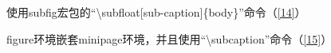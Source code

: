 \documentclass{article}
\begin{document}
    使用subfig宏包的``\textbackslash subfloat[sub-caption]\{body\}''命令（\ref{14}）


    figure环境嵌套minipage环境，并且使用``\textbackslash subcaption{}''命令（\ref{15}）
\end{document}
